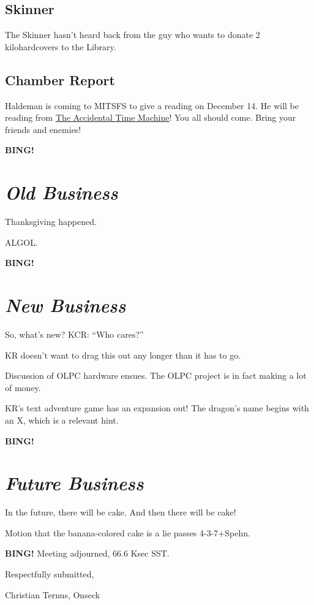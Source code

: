 \documentclass[10pt]{article}
\newcommand{\bing}{{\bf BING!} }
\newcommand{\goto}[1]{\bing \vskip 12pt \section*{{\em{#1}}}}
\begin{document}
\subsection*{Skinner}

The Skinner hasn't heard back from the guy who wants to donate 2
kilohardcovers to the Library.

\subsection*{Chamber Report}

Haldeman is coming to MITSFS to give a reading on December 14. He will be reading from \underline{The Accidental Time Machine}! You all should come.  Bring your friends and enemies!

\goto{Old Business}

Thanksgiving happened.

ALGOL.

\goto{New Business}

So, what's new?  KCR:  ``Who cares?''

KR doesn't want to drag this out any longer than it has to go.

Discussion of OLPC hardware ensues.  The OLPC project is in fact
making a lot of money.

KR's text adventure game has an expansion out!  The dragon's name
begins with an X, which is a relevant hint.

\goto{Future Business}

In the future, there will be cake.  And then there will be cake!

Motion that the banana-colored cake is a lie passes 4-3-7+Spehn.

\bing
\noindent
Meeting adjourned, 66.6 Ksec SST.

\vspace{18pt}

\centerline{Respectfully submitted,}
\centerline{Christian Ternus, Onseck}
\end{document}
